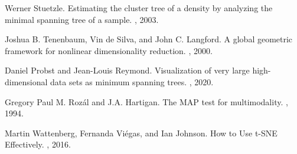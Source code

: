 \documentclass{article}
\begin{document}
\begin{thebibliography}{10}
Werner Stuetzle.
\newblock Estimating the cluster tree of a density by analyzing the minimal spanning tree of a sample.
, 2003.

Joshua B. Tenenbaum, Vin de Silva, and John C. Langford.
\newblock A global geometric framework for nonlinear dimensionality reduction.
, 2000.

Daniel Probst and Jean-Louis Reymond.
\newblock Visualization of very large high-dimensional data sets as minimum spanning trees.
, 2020.

Gregory Paul M. Roz\'al and J.A. Hartigan.
\newblock The MAP test for multimodality.
, 1994.

Martin Wattenberg, Fernanda Vi\'egas, and Ian Johnson.
\newblock How to Use t-SNE Effectively.
, 2016.

\end{thebibliography}
\end{document}
